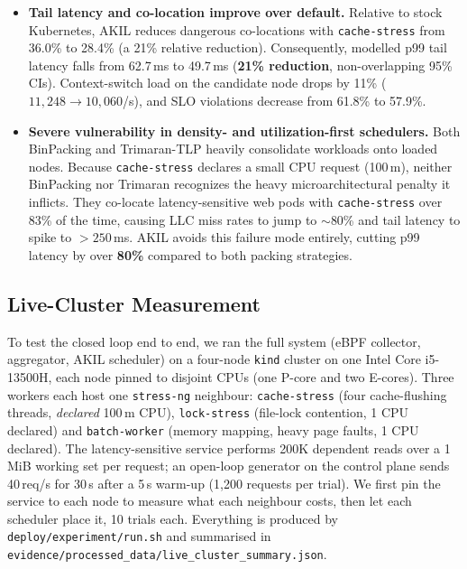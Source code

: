 \documentclass[10pt,conference,a4paper]{IEEEtran}
\newcommand{\akil}{\textsc{AKIL}\xspace}
\newcommand{\sys}{\akil}
\begin{document}
\begin{itemize}[leftmargin=*,topsep=1pt,itemsep=1pt]
  \item \textbf{Tail latency and co-location improve over default.} Relative to stock Kubernetes,
        \sys reduces dangerous co-locations with \texttt{cache-stress} from 36.0\% to 28.4\%
        (a 21\% relative reduction). Consequently, modelled p99 tail latency falls from 62.7\,ms
        to 49.7\,ms (\textbf{21\% reduction}, non-overlapping 95\% CIs). Context-switch load on
        the candidate node drops by 11\% ($11{,}248 \to 10{,}060$/s), and SLO violations decrease
        from 61.8\% to 57.9\%.
  \item \textbf{Severe vulnerability in density- and utilization-first schedulers.}
        Both BinPacking and Trimaran-TLP heavily consolidate workloads onto loaded nodes. Because
        \texttt{cache-stress} declares a small CPU request (100\,m), neither BinPacking nor
        Trimaran recognizes the heavy microarchitectural penalty it inflicts. They co-locate
        latency-sensitive web pods with \texttt{cache-stress} over 83\% of the time, causing LLC
        miss rates to jump to $\sim$80\% and tail latency to spike to $>250$\,ms. \sys avoids
        this failure mode entirely, cutting p99 latency by over \textbf{80\%} compared to both
        packing strategies.
\end{itemize}

\subsection{Live-Cluster Measurement}
\label{sec:live}

To test the closed loop end to end, we ran the full system (eBPF collector, aggregator,
\sys scheduler) on a four-node \texttt{kind} cluster on one Intel Core i5-13500H, each
node pinned to disjoint CPUs (one P-core and two E-cores). Three workers each host one
\texttt{stress-ng} neighbour: \texttt{cache-stress} (four cache-flushing threads,
\emph{declared} 100\,m CPU), \texttt{lock-stress} (file-lock contention, 1 CPU declared)
and \texttt{batch-worker} (memory mapping, heavy page faults, 1 CPU declared). The
latency-sensitive service performs 200K dependent reads over a 1\,MiB working set per
request; an open-loop generator on the control plane sends 40\,req/s for 30\,s after a
5\,s warm-up (1{,}200 requests per trial). We first pin the service to each node to
measure what each neighbour costs, then let each scheduler place it, 10 trials each.
Everything is produced by \texttt{deploy/experiment/run.sh} and summarised in
\texttt{evidence/processed\_data/live\_cluster\_summary.json}.
\end{document}
